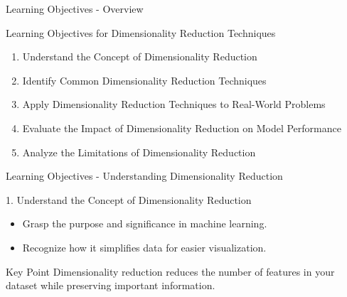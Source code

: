 \documentclass[aspectratio=169]{beamer}
\begin{document}
\begin{frame}[fragile]{Learning Objectives - Overview}
    \begin{block}{Learning Objectives for Dimensionality Reduction Techniques}
        \begin{enumerate}
            \item Understand the Concept of Dimensionality Reduction
            \item Identify Common Dimensionality Reduction Techniques
            \item Apply Dimensionality Reduction Techniques to Real-World Problems
            \item Evaluate the Impact of Dimensionality Reduction on Model Performance
            \item Analyze the Limitations of Dimensionality Reduction
        \end{enumerate}
    \end{block}
\end{frame}

\begin{frame}[fragile]{Learning Objectives - Understanding Dimensionality Reduction}
    \begin{block}{1. Understand the Concept of Dimensionality Reduction}
        \begin{itemize}
            \item Grasp the purpose and significance in machine learning.
            \item Recognize how it simplifies data for easier visualization.
        \end{itemize}
        \begin{block}{Key Point}
            Dimensionality reduction reduces the number of features in your dataset while preserving important information.
        \end{block}
    \end{block}
\end{frame}
\end{document}
